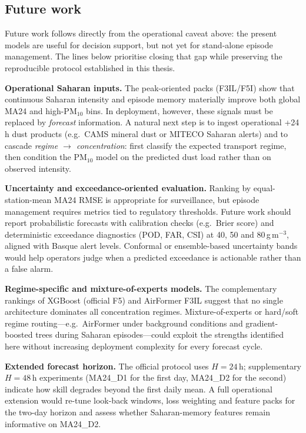 \documentclass[11pt]{article}
\newcommand{\revnew}[1]{\textcolor{orange!75!black}{#1}}
\begin{document}
\subsection{Future work}
\label{sec:future-work}

\revnew{Future work follows directly from the operational caveat above: the present models are useful for decision support, but not yet for stand-alone episode management. The lines below prioritise closing that gap while preserving the reproducible protocol established in this thesis.}

\revnew{\textbf{Operational Saharan inputs.} The peak-oriented packs (F3IL/F5I) show that continuous Saharan intensity and episode memory materially improve both global MA24 and high-PM$_{10}$ bins. In deployment, however, these signals must be replaced by \emph{forecast} information. A natural next step is to ingest operational +24\,h dust products (e.g.\ CAMS mineral dust or MITECO Saharan alerts) and to cascade \emph{regime $\to$ concentration}: first classify the expected transport regime, then condition the PM$_{10}$ model on the predicted dust load rather than on observed intensity.}

\revnew{\textbf{Uncertainty and exceedance-oriented evaluation.} Ranking by equal-station-mean MA24 RMSE is appropriate for surveillance, but episode management requires metrics tied to regulatory thresholds. Future work should report probabilistic forecasts with calibration checks (e.g.\ Brier score) and deterministic exceedance diagnostics (POD, FAR, CSI) at 40, 50 and 80\,\textmu g\,m$^{-3}$, aligned with Basque alert levels. Conformal or ensemble-based uncertainty bands would help operators judge when a predicted exceedance is actionable rather than a false alarm.}

\revnew{\textbf{Regime-specific and mixture-of-experts models.} The complementary rankings of XGBoost (official F5) and AirFormer F3IL suggest that no single architecture dominates all concentration regimes. Mixture-of-experts or hard/soft regime routing---e.g.\ AirFormer under background conditions and gradient-boosted trees during Saharan episodes---could exploit the strengths identified here without increasing deployment complexity for every forecast cycle.}

\revnew{\textbf{Extended forecast horizon.} The official protocol uses $H{=}24$\,h; supplementary $H{=}48$\,h experiments (MA24\_D1 for the first day, MA24\_D2 for the second) indicate how skill degrades beyond the first daily mean. A full operational extension would re-tune look-back windows, loss weighting and feature packs for the two-day horizon and assess whether Saharan-memory features remain informative on MA24\_D2.}
\end{document}
